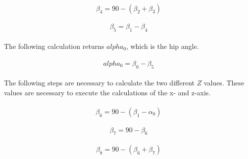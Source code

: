 \documentclass{article}
\begin{document}
    \paragraph{}
    \begin{equation}
        \beta_4 = 90 - (\beta_2 + \beta_3)
    \end{equation}

    \paragraph{}
    \begin{equation}
        \beta_5 = \beta_1 - \beta_4
    \end{equation}

    \paragraph{}
    The following calculation returns $alpha_0$, which is the hip angle. 

    \paragraph{}
    \begin{equation}
        alpha_0 = \beta_0 - \beta_5
    \end{equation}

    \paragraph{}
    The following steps are necessary to calculate the two different $Z$ values. These values are necessary to execute the calculations of the x- and z-axis.

    \paragraph{}
    \begin{equation}
        \beta_6 = 90 - (\beta_1 - \alpha_0)
    \end{equation}

    \paragraph{}
    \begin{equation}
        \beta_7 = 90 - \beta_6
    \end{equation}

    \paragraph{}
    \begin{equation}
        \beta_8 = 90 - (\beta_6 + \beta_7)
    \end{equation}
\end{document}
